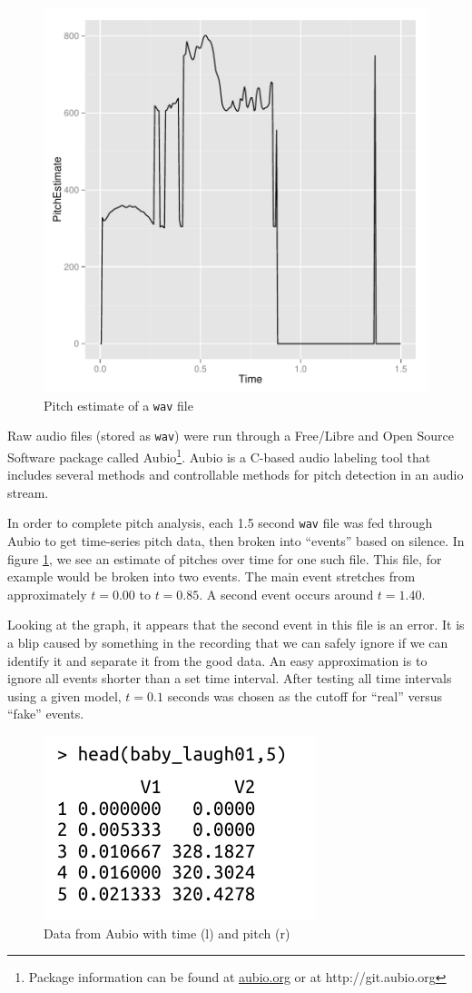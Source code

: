 \documentclass[paper=a4, fontsize=11pt]{scrartcl}
\numberwithin{equation}{section}
\numberwithin{figure}{section}
\numberwithin{table}{section}
\begin{document}
\begin{figure}
\begin{center}
\vspace{-20pt}
\includegraphics[width=.38\textwidth]{pitch_time.pdf}
\caption{Pitch estimate of a \texttt{wav} file}\label{fig:aubiograph}
\vspace{-20pt}
\end{center}
\end{figure}

\noindent Raw audio files (stored as \texttt{wav}) were run through a Free/Libre and Open Source Software package called Aubio\footnote{Package information can be found at \url{aubio.org} or at http://git.aubio.org}. Aubio is a C-based audio labeling tool that includes several methods and controllable methods for pitch detection in an audio stream.

\noindent In order to complete pitch analysis, each 1.5 second \texttt{wav} file was fed through Aubio to get time-series pitch data, then broken into ``events'' based on silence. In figure \ref{fig:aubiograph}, we see an estimate of pitches over time for one such file. This file, for example would be broken into two events. The main event stretches from approximately $t=0.00$ to $t=0.85$. A second event occurs around $t=1.40$.

\noindent Looking at the graph, it appears that the second event in this file is an error. It is a blip caused by something in the recording that we can safely ignore if we can identify it and separate it from the good data. An easy approximation is to ignore all events shorter than a set time interval. After testing all time intervals using a given model, $t=0.1$ seconds was chosen as the cutoff for ``real'' versus ``fake'' events.

\begin{figure}
\begin{center}
\vspace{-15pt}
\includegraphics[width=.28\textwidth]{aubio_out.pdf}
\caption{Data from Aubio with time (l) and pitch (r)}\label{fig:headaubio}
\end{center}
\vspace{-20pt}
\end{figure}
\end{document}
